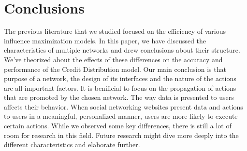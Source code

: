 \documentclass{acm_proc_article-sp}
\begin{document}
\section{Conclusions}

The previous literature that we studied focused on the efficiency of various influence maximization models. In this paper, we have discussed the characteristics of multiple networks and drew conclusions about their structure. We've theorized about the effects of these differences on the accuracy and performance of the Credit Distribution model.  Our main conclusion is that purpose of a network, the design of its interfaces and the nature of the actions are all important factors. It is benificial to focus on the propagation of actions that are promoted by the chosen network. The way data is presented to users affects their behavior. When social networking websites present data and actions to users in a meaningful, personalized manner, users are more likely to execute certain actions. While we observed some key differences, there is still a lot of room for research in this field. Future research might dive more deeply into the different characteristics and elaborate further.  


%

%

\balancecolumns
\end{document}
